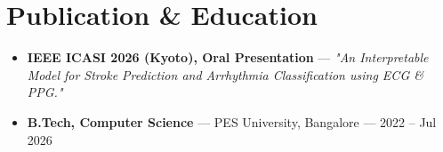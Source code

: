 \documentclass[10pt,a4paper]{article}
\begin{document}
\section*{Publication \& Education}
\begin{itemize}
\item \textbf{IEEE ICASI 2026 (Kyoto), Oral Presentation} --- \textit{"An Interpretable Model for Stroke Prediction and Arrhythmia Classification using ECG \& PPG."}
\item \textbf{B.Tech, Computer Science} --- PES University, Bangalore --- 2022 -- Jul 2026
\end{itemize}
\end{document}
